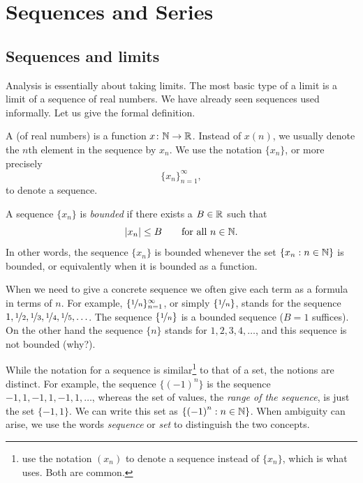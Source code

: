 \chapter{Sequences and Series} \label{seq:chapter}


\section{Sequences and limits}
\label{sec:seqsandlims}


Analysis is essentially about taking limits.  The most basic type of a limit
is a limit of a sequence of real numbers.
We have already seen sequences used informally.  Let us give the formal
definition.

\begin{defn}
A \emph{} (of real numbers) is a function $x \colon {\mathbb{N}} \to
{\mathbb{R}}$.  Instead of $x(n)$, we 
usually denote the $n$th element in the sequence by $x_n$.  We 
use the notation $\{ x_n \}$, or more precisely
\begin{equation*}
\{ x_n \}_{n=1}^\infty,
\end{equation*}
to denote a sequence.

A sequence $\{ x_n \}$ is \emph{bounded} if
there exists a $B \in {\mathbb{R}}$ such that
\begin{equation*}
\left\lvert {x_n} \right\rvert \leq B \qquad \text{for all } n \in {\mathbb{N}}.
\end{equation*}
In other words, the sequence $\{x_n\}$ is bounded whenever
the set $\{ x_n : n \in {\mathbb{N}} \}$
is bounded, or equivalently when it is bounded as a function.
\end{defn}

When we need
to give a concrete sequence we often give each term as a formula in
terms of $n$.
For example, $\{ \nicefrac{1}{n} \}_{n=1}^\infty$, or simply $\{
\nicefrac{1}{n} \}$, stands for
the sequence $1, \nicefrac{1}{2}, \nicefrac{1}{3}, \nicefrac{1}{4},
\nicefrac{1}{5}, \ldots$.
The sequence $\{ \nicefrac{1}{n} \}$
is a bounded sequence ($B=1$ suffices).  On the other hand the sequence $\{ n \}$ stands for
$1,2,3,4,\ldots$, and this sequence is not bounded (why?).

While the notation for a sequence
is similar\footnote{\cite{BS} use the notation $(x_n)$ to denote
a sequence instead of $\{ x_n \}$, which is what \cite{Rudin:baby} uses.
Both are common.}
to that of a set, the notions are
distinct.  For example, the sequence $\{ {(-1)}^n \}$ is the sequence
$-1,1,-1,1,-1,1,\ldots$, whereas the set of values, the
\emph{range of the sequence},
is just the set $\{ -1, 1 \}$.  We can write this set
as $\{ {(-1)}^n : n \in {\mathbb{N}} \}$.   When ambiguity can arise, we
use the words \emph{sequence} or \emph{set} to distinguish the two
concepts.

